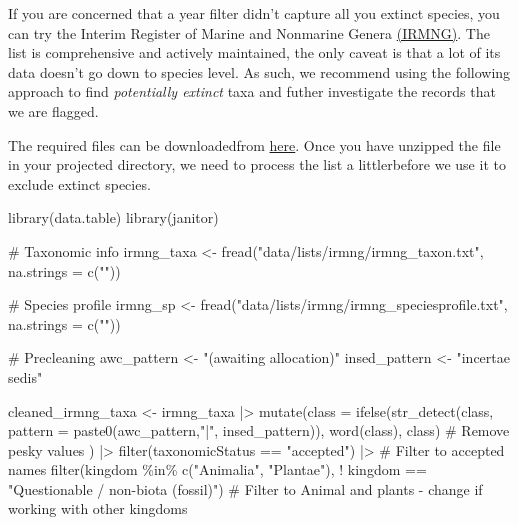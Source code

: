 \documentclass[
  letterpaper,
  DIV=11,
  numbers=noendperiod,
  oneside]{scrreprt}
\newenvironment{Shaded}{\begin{snugshade}}{\end{snugshade}}
\newcommand{\AttributeTok}[1]{\textcolor[rgb]{0.40,0.45,0.13}{#1}}
\newcommand{\CommentTok}[1]{\textcolor[rgb]{0.37,0.37,0.37}{#1}}
\newcommand{\FunctionTok}[1]{\textcolor[rgb]{0.28,0.35,0.67}{#1}}
\newcommand{\NormalTok}[1]{\textcolor[rgb]{0.00,0.23,0.31}{#1}}
\newcommand{\OtherTok}[1]{\textcolor[rgb]{0.00,0.23,0.31}{#1}}
\newcommand{\SpecialCharTok}[1]{\textcolor[rgb]{0.37,0.37,0.37}{#1}}
\newcommand{\StringTok}[1]{\textcolor[rgb]{0.13,0.47,0.30}{#1}}
\begin{document}
If you are concerned that a year filter didn't capture all you extinct
species, you can try the Interim Register of Marine and Nonmarine Genera
\href{https://www.irmng.org/}{(IRMNG)}. The list is comprehensive and
actively maintained, the only caveat is that a lot of its data doesn't
go down to species level. As such, we recommend using the following
approach to find \emph{potentially extinct} taxa and futher investigate
the records that we are flagged.

The required files can be downloadedfrom
\href{https://www.irmng.org/export/}{here}. Once you have unzipped the
file in your projected directory, we need to process the list a
littlerbefore we use it to exclude extinct species.

\begin{Shaded}
\begin{Highlighting}[]
\FunctionTok{library}\NormalTok{(data.table)}
\FunctionTok{library}\NormalTok{(janitor)}

\CommentTok{\# Taxonomic info}
\NormalTok{irmng\_taxa }\OtherTok{\textless{}{-}} \FunctionTok{fread}\NormalTok{(}\StringTok{"data/lists/irmng/irmng\_taxon.txt"}\NormalTok{, }\AttributeTok{na.strings =} \FunctionTok{c}\NormalTok{(}\StringTok{""}\NormalTok{))}

\CommentTok{\# Species profile}
\NormalTok{irmng\_sp }\OtherTok{\textless{}{-}} \FunctionTok{fread}\NormalTok{(}\StringTok{"data/lists/irmng/irmng\_speciesprofile.txt"}\NormalTok{, }\AttributeTok{na.strings =} \FunctionTok{c}\NormalTok{(}\StringTok{""}\NormalTok{))}

\CommentTok{\# Precleaning }
\NormalTok{awc\_pattern }\OtherTok{\textless{}{-}} \StringTok{"(awaiting allocation)"}
\NormalTok{insed\_pattern }\OtherTok{\textless{}{-}} \StringTok{"incertae sedis"}

\NormalTok{cleaned\_irmng\_taxa }\OtherTok{\textless{}{-}}\NormalTok{ irmng\_taxa }\SpecialCharTok{|\textgreater{}} 
  \FunctionTok{mutate}\NormalTok{(}\AttributeTok{class =} \FunctionTok{ifelse}\NormalTok{(}\FunctionTok{str\_detect}\NormalTok{(class, }\AttributeTok{pattern =} \FunctionTok{paste0}\NormalTok{(awc\_pattern,}\StringTok{"|"}\NormalTok{, insed\_pattern)),}
                        \FunctionTok{word}\NormalTok{(class), class) }\CommentTok{\# Remove pesky values}
\NormalTok{         ) }\SpecialCharTok{|\textgreater{}} 
  \FunctionTok{filter}\NormalTok{(taxonomicStatus }\SpecialCharTok{==} \StringTok{"accepted"}\NormalTok{) }\SpecialCharTok{|\textgreater{}} \CommentTok{\# Filter to accepted names }
  \FunctionTok{filter}\NormalTok{(kingdom }\SpecialCharTok{\%in\%} \FunctionTok{c}\NormalTok{(}\StringTok{"Animalia"}\NormalTok{, }\StringTok{"Plantae"}\NormalTok{),}
         \SpecialCharTok{!}\NormalTok{ kingdom }\SpecialCharTok{==} \StringTok{"Questionable / non{-}biota (fossil)"}\NormalTok{) }\CommentTok{\# Filter to Animal and plants {-} change if working with other kingdoms}


\end{Highlighting}
\end{Shaded}
\end{document}

